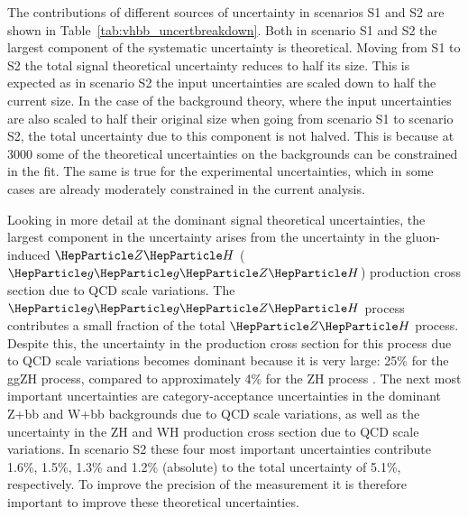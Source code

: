 The contributions of different sources of uncertainty in scenarios S1 and S2 are shown in Table~\ref{tab:vhbb_uncertbreakdown}.
Both in scenario S1 and S2 the largest component of the systematic uncertainty is theoretical. Moving from S1 to S2 the total signal theoretical uncertainty reduces to half its size. This is expected as in scenario S2 the input uncertainties
are scaled down to half the current size. In the case of the background theory, where the input uncertainties are also scaled to half their original
size when going from scenario S1 to scenario S2, the total uncertainty due to this component is not halved. This is because at 3000 \Uifb
some of the theoretical uncertainties on the backgrounds can be constrained in the fit. The same is true for the experimental uncertainties, which
in some cases are already moderately constrained in the current analysis.

Looking in more detail at the dominant signal theoretical uncertainties, the largest component in the uncertainty arises from the uncertainty in the gluon-induced $\zh$ ($\ggZH$) production cross section due to QCD scale variations.
The $\ggZH$ process contributes a small fraction of the total $\zh$ process. Despite this, the uncertainty in the production cross section for this process due to QCD scale variations 
becomes dominant because it is very large: 25\% for the ggZH process, compared to approximately 4\% for the ZH process \cite{deFlorian:2016spz}.
The next most important uncertainties are category-acceptance uncertainties in the dominant Z+bb and W+bb backgrounds due to QCD scale variations, as well as the uncertainty in the ZH and WH production
cross section due to QCD scale variations. In scenario S2 these four most important uncertainties contribute 1.6\%, 1.5\%, 1.3\% and 1.2\% (absolute) to
the total uncertainty of 5.1\%, respectively. To improve the precision of the measurement it is therefore important to improve these theoretical uncertainties.

